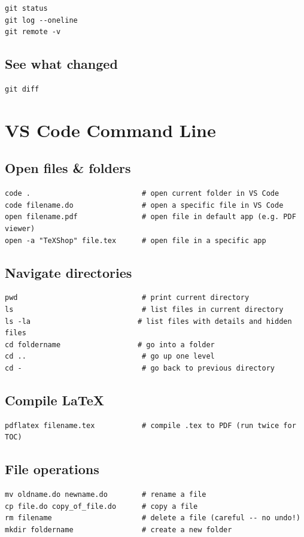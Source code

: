 \documentclass[11pt]{article}
\begin{document}
\begin{lstlisting}[style=bash]
git status
git log --oneline
git remote -v
\end{lstlisting}

\subsection{See what changed}

\begin{lstlisting}[style=bash]
git diff
\end{lstlisting}

\section{VS Code Command Line}

\subsection{Open files \& folders}

\begin{lstlisting}[style=bash]
code .                          # open current folder in VS Code
code filename.do                # open a specific file in VS Code
open filename.pdf               # open file in default app (e.g. PDF viewer)
open -a "TeXShop" file.tex      # open file in a specific app
\end{lstlisting}

\subsection{Navigate directories}

\begin{lstlisting}[style=bash]
pwd                             # print current directory
ls                              # list files in current directory
ls -la                         # list files with details and hidden files
cd foldername                  # go into a folder
cd ..                           # go up one level
cd -                            # go back to previous directory
\end{lstlisting}

\subsection{Compile LaTeX}

\begin{lstlisting}[style=bash]
pdflatex filename.tex           # compile .tex to PDF (run twice for TOC)
\end{lstlisting}

\subsection{File operations}

\begin{lstlisting}[style=bash]
mv oldname.do newname.do        # rename a file
cp file.do copy_of_file.do      # copy a file
rm filename                     # delete a file (careful -- no undo!)
mkdir foldername                # create a new folder
\end{lstlisting}
\end{document}
